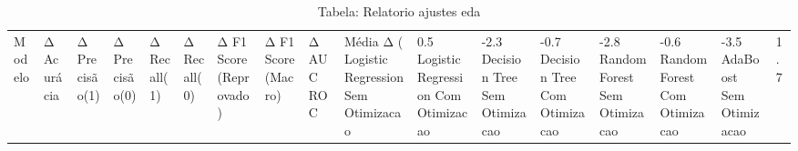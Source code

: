 \begin{table}[H] %
    \centering
    \caption{Tabela: Relatorio ajustes eda}
    \label{tab:relatorio_ajustes_eda}
    \renewcommand{\arraystretch}{1.25} %
    \begin{adjustwidth}{ -1in }{ -1in } %
    \centering %
    \small %
    \begin{tabular}{lllllllllll}
\toprule
                            Modelo & Δ Acurácia & Δ Precisão(1) & Δ Precisão(0) & Δ Recall(1) & Δ Recall(0) & Δ F1 Score (Reprovado) & Δ F1 Score (Macro) & Δ AUC ROC & Média Δ (%
\midrule
Logistic Regression Sem Otimizacao &       0.5%
Logistic Regression Com Otimizacao &      -2.3%
      Decision Tree Sem Otimizacao &      -0.7%
      Decision Tree Com Otimizacao &      -2.8%
      Random Forest Sem Otimizacao &      -0.6%
      Random Forest Com Otimizacao &      -3.5%
           AdaBoost Sem Otimizacao &       1.7%

\end{tabular}
\end{adjustwidth}
\end{table}
